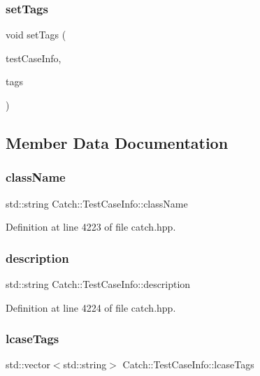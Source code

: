 \subsubsection{setTags}
{\footnotesize\ttfamily void set\+Tags (\begin{DoxyParamCaption}\item[{\textbf{ Test\+Case\+Info} \&}]{test\+Case\+Info,  }\item[{std\+::vector$<$ std\+::string $>$}]{tags }\end{DoxyParamCaption})\hspace{0.3cm}{\ttfamily [friend]}}



\subsection{Member Data Documentation}
\mbox{\label{struct_catch_1_1_test_case_info_a1a5e0825132a38d091defdebbf2f8ce9}} 
\subsubsection{className}
{\footnotesize\ttfamily std\+::string Catch\+::\+Test\+Case\+Info\+::class\+Name}



Definition at line 4223 of file catch.\+hpp.

\mbox{\label{struct_catch_1_1_test_case_info_a37fe2db9425bc45f6a33893eac31198e}} 
\subsubsection{description}
{\footnotesize\ttfamily std\+::string Catch\+::\+Test\+Case\+Info\+::description}



Definition at line 4224 of file catch.\+hpp.

\mbox{\label{struct_catch_1_1_test_case_info_a844e3de9baf6e53cadfba9733c236bfe}} 
\subsubsection{lcaseTags}
{\footnotesize\ttfamily std\+::vector$<$std\+::string$>$ Catch\+::\+Test\+Case\+Info\+::lcase\+Tags}



